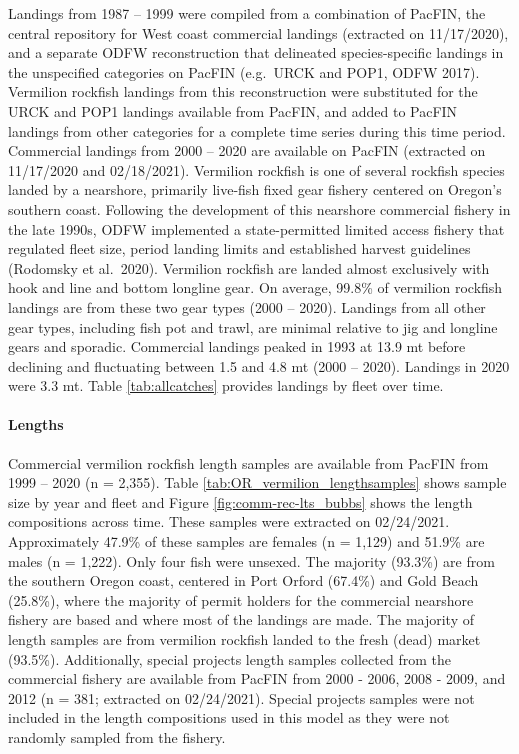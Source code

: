 \documentclass[11pt,
  english,
  a4paper,
]{article}
\begin{document}
Landings from 1987 -- 1999 were compiled from a combination of PacFIN, the central repository for West coast commercial landings (extracted on 11/17/2020), and a separate ODFW reconstruction that delineated species-specific landings in the unspecified categories on PacFIN (e.g.~URCK and POP1, ODFW 2017). Vermilion rockfish landings from this reconstruction were substituted for the URCK and POP1 landings available from PacFIN, and added to PacFIN landings from other categories for a complete time series during this time period. Commercial landings from 2000 -- 2020 are available on PacFIN (extracted on 11/17/2020 and 02/18/2021). Vermilion rockfish is one of several rockfish species landed by a nearshore, primarily live-fish fixed gear fishery centered on Oregon's southern coast. Following the development of this nearshore commercial fishery in the late 1990s, ODFW implemented a state-permitted limited access fishery that regulated fleet size, period landing limits and established harvest guidelines (Rodomsky et al.~2020). Vermilion rockfish are landed almost exclusively with hook and line and bottom longline gear. On average, 99.8\% of vermilion rockfish landings are from these two gear types (2000 -- 2020). Landings from all other gear types, including fish pot and trawl, are minimal relative to jig and longline gears and sporadic. Commercial landings peaked in 1993 at 13.9 mt before declining and fluctuating between 1.5 and 4.8 mt (2000 -- 2020). Landings in 2020 were 3.3 mt. Table \ref{tab:allcatches} provides landings by fleet over time.

\leavevmode\tagmcend\tagstructend\par


\hypertarget{lengths}{%
\paragraph{Lengths}\label{lengths}}

\leavevmode\tagmcend\tagstructend


Commercial vermilion rockfish length samples are available from PacFIN from 1999 -- 2020 (n = 2,355). Table \ref{tab:OR_vermilion_lengthsamples} shows sample size by year and fleet and Figure \ref{fig:comm-rec-lts_bubbs} shows the length compositions across time. These samples were extracted on 02/24/2021. Approximately 47.9\% of these samples are females (n = 1,129) and 51.9\% are males (n = 1,222). Only four fish were unsexed. The majority (93.3\%) are from the southern Oregon coast, centered in Port Orford (67.4\%) and Gold Beach (25.8\%), where the majority of permit holders for the commercial nearshore fishery are based and where most of the landings are made. The majority of length samples are from vermilion rockfish landed to the fresh (dead) market (93.5\%). Additionally, special projects length samples collected from the commercial fishery are available from PacFIN from 2000 - 2006, 2008 - 2009, and 2012 (n = 381; extracted on 02/24/2021). Special projects samples were not included in the length compositions used in this model as they were not randomly sampled from the fishery.
\end{document}
